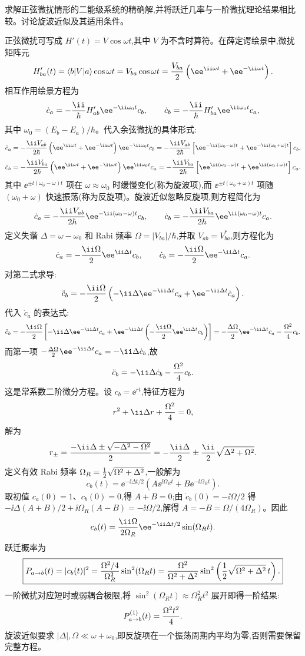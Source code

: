 \begin{question}
求解正弦微扰情形的二能级系统的精确解,并将跃迁几率与一阶微扰理论结果相比较。讨论旋波近似及其适用条件。
\end{question}
\begin{solution}
正弦微扰可写成 $H'(t)=V\cos\omega t$,其中 $V$ 为不含时算符。在薛定谔绘景中,微扰矩阵元
\[
H'_{ba}(t)=\langle b|V|a\rangle\cos\omega t
=V_{ba}\cos\omega t={V_{ba}\over2}\left(\ee^{\ii\omega t}+\ee^{-\ii\omega t}\right).
\]
相互作用绘景方程为
\[
\dot c_a=-{\ii\over\hbar}H'_{ab}\ee^{-\ii\omega_0t}c_b,\qquad
\dot c_b=-{\ii\over\hbar}H'_{ba}\ee^{\ii\omega_0t}c_a,
\]
其中 $\omega_0=(E_b-E_a)/\hbar$。代入余弦微扰的具体形式:
\[
\dot c_a=-{\ii V_{ab}\over2\hbar}\left(\ee^{\ii\omega t}+\ee^{-\ii\omega t}\right)\ee^{-\ii\omega_0t}c_b
=-{\ii V_{ab}\over2\hbar}\left[\ee^{-\ii(\omega_0-\omega)t}+\ee^{-\ii(\omega_0+\omega)t}\right]c_b,
\]
\[
\dot c_b=-{\ii V_{ba}\over2\hbar}\left(\ee^{\ii\omega t}+\ee^{-\ii\omega t}\right)\ee^{\ii\omega_0t}c_a
=-{\ii V_{ba}\over2\hbar}\left[\ee^{\ii(\omega_0-\omega)t}+\ee^{\ii(\omega_0+\omega)t}\right]c_a.
\]
其中 $\ee^{\pm\ii(\omega_0-\omega)t}$ 项在 $\omega\approx\omega_0$ 时缓慢变化(称为旋波项),而 $\ee^{\pm\ii(\omega_0+\omega)t}$ 项随 $(\omega_0+\omega)$ 快速振荡(称为反旋项)。旋波近似忽略反旋项,则方程简化为
\[
\dot c_a=-{\ii V_{ab}\over2\hbar}\ee^{-\ii(\omega_0-\omega)t}c_b,\qquad
\dot c_b=-{\ii V_{ba}\over2\hbar}\ee^{\ii(\omega_0-\omega)t}c_a.
\]
定义失谐 $\Delta=\omega-\omega_0$ 和 Rabi 频率 $\Omega=|V_{ba}|/\hbar$,并取 $V_{ab}=V_{ba}^*$,则方程化为
\[
\dot c_a=-{\ii\Omega\over2}\ee^{\ii\Delta t}c_b,\qquad
\dot c_b=-{\ii\Omega\over2}\ee^{-\ii\Delta t}c_a.
\]
对第二式求导:
\[
\ddot c_b=-{\ii\Omega\over2}\left(-\ii\Delta \ee^{-\ii\Delta t}c_a+\ee^{-\ii\Delta t}\dot c_a\right).
\]
代入 $\dot c_a$ 的表达式:
\[
\ddot c_b=-{\ii\Omega\over2}\left[-\ii\Delta \ee^{-\ii\Delta t}c_a
+\ee^{-\ii\Delta t}\left(-{\ii\Omega\over2}\ee^{\ii\Delta t}c_b\right)\right]
=-{\Delta\Omega\over2}\ee^{-\ii\Delta t}c_a-{\Omega^2\over4}c_b.
\]
而第一项 $-{\Delta\Omega\over2}\ee^{-\ii\Delta t}c_a=-\ii\Delta\dot c_b$,故
\[
\ddot c_b=-\ii\Delta\dot c_b-{\Omega^2\over4}c_b.
\]
这是常系数二阶微分方程。设 $c_b=\ee^{rt}$,特征方程为
\[
r^2+\ii\Delta r+{\Omega^2\over4}=0,
\]
解为
\[
r_\pm={-\ii\Delta\pm\sqrt{-\Delta^2-\Omega^2}\over2}
=-{\ii\Delta\over2}\pm{\ii\over2}\sqrt{\Delta^2+\Omega^2}.
\]
定义有效 Rabi 频率 $\Omega_R={1\over2}\sqrt{\Omega^2+\Delta^2}$,一般解为
\[
c_b(t)=\ee^{-\ii\Delta t/2}\left(A \ee^{\ii\Omega_R t}+B \ee^{-\ii\Omega_R t}\right).
\]
取初值 $c_a(0)=1$、$c_b(0)=0$,得 $A+B=0$;由 $\dot c_b(0)=-\ii\Omega/2$ 得 $-\ii\Delta(A+B)/2+\ii\Omega_R(A-B)=-\ii\Omega/2$,解得 $A=-B=\Omega/(4\Omega_R)$。因此
\[
c_b(t)={\ii\Omega\over2\Omega_R}\ee^{-\ii\Delta t/2}\sin(\Omega_R t).
\]
跃迁概率为
\[
\boxed{P_{a\to b}(t)=|c_b(t)|^2={\Omega^2/4\over\Omega_R^2}\sin^2(\Omega_R t)
={\Omega^2\over\Omega^2+\Delta^2}
\sin^2\left({1\over2}\sqrt{\Omega^2+\Delta^2}\,t\right).}
\]
一阶微扰对应短时或弱耦合极限,将 $\sin^2(\Omega_R t)\approx\Omega_R^2 t^2$ 展开即得一阶结果:
\[
P_{a\to b}^{(1)}(t)={\Omega^2 t^2\over4}.
\]
旋波近似要求 $|\Delta|,\Omega\ll\omega+\omega_0$,即反旋项在一个振荡周期内平均为零,否则需要保留完整方程。
\end{solution}

